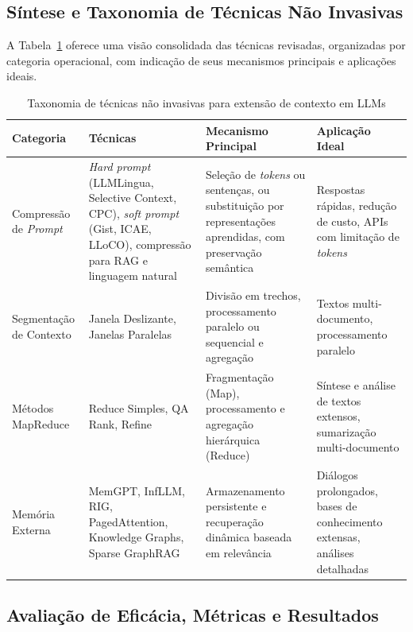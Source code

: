 \subsection{Síntese e Taxonomia de Técnicas Não Invasivas}
\label{subsec:taxonomia}

A Tabela~\ref{tab:taxonomia} oferece uma visão consolidada das técnicas revisadas, organizadas por categoria operacional, com indicação de seus mecanismos principais e aplicações ideais.

\begin{table}[htbp]
\centering
\caption{Taxonomia de técnicas não invasivas para extensão de contexto em LLMs}
\label{tab:taxonomia}
\begin{tabular}{p{2.6cm}p{3.0cm}p{3.2cm}p{3.2cm}}
\toprule
\textbf{Categoria} & \textbf{Técnicas} & \textbf{Mecanismo Principal} & \textbf{Aplicação Ideal} \\
\midrule
Compressão de \textit{Prompt} & \textit{Hard prompt} (LLMLingua, Selective Context, CPC), \textit{soft prompt} (Gist, ICAE, LLoCO), compressão para RAG e linguagem natural & Seleção de \textit{tokens} ou sentenças, ou substituição por representações aprendidas, com preservação semântica & Respostas rápidas, redução de custo, APIs com limitação de \textit{tokens} \\
\addlinespace
Segmentação de Contexto & Janela Deslizante, Janelas Paralelas & Divisão em trechos, processamento paralelo ou sequencial e agregação & Textos multi-documento, processamento paralelo \\
\addlinespace
Métodos MapReduce & Reduce Simples, QA Rank, Refine & Fragmentação (Map), processamento e agregação hierárquica (Reduce) & Síntese e análise de textos extensos, sumarização multi-documento \\
\addlinespace
Memória Externa & MemGPT, InfLLM, RIG, PagedAttention, Knowledge Graphs, Sparse GraphRAG & Armazenamento persistente e recuperação dinâmica baseada em relevância & Diálogos prolongados, bases de conhecimento extensas, análises detalhadas \\
\bottomrule
\end{tabular}
\end{table}

\subsection{Avaliação de Eficácia, Métricas e Resultados}
\label{subsec:avaliacao-eficacia}

